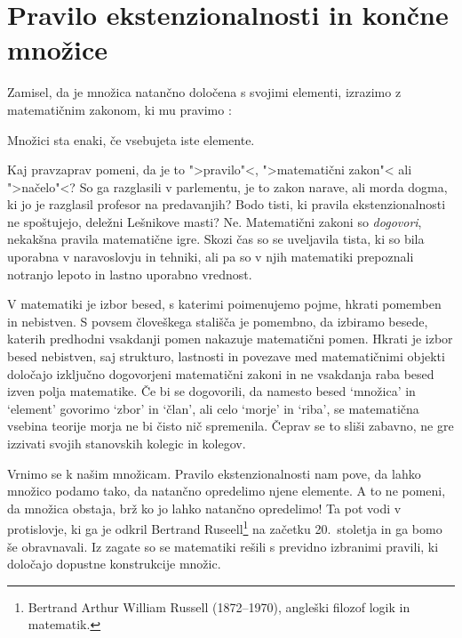 \section{Pravilo ekstenzionalnosti in končne množice}
\label{sec:koncne-mnozice}
\label{sec:nacelo-ekstenzionalnosti}

Zamisel, da je množica natančno določena s svojimi elementi, izrazimo z matematičnim
zakonom, ki mu pravimo :

\begin{pravilo}
  Množici sta enaki, če vsebujeta iste elemente.
\end{pravilo}

Kaj pravzaprav pomeni, da je to ">pravilo"<, ">matematični zakon"< ali ">načelo"<? So ga
razglasili v parlementu, je to zakon narave, ali morda dogma, ki jo je razglasil profesor
na predavanjih? Bodo tisti, ki pravila ekstenzionalnosti ne spoštujejo, deležni Lešnikove
masti? Ne. Matematični zakoni so \emph{dogovori}, nekakšna pravila matematične igre. Skozi
čas so se uveljavila tista, ki so bila uporabna v naravoslovju in tehniki, ali pa so v njih
matematiki prepoznali notranjo lepoto in lastno uporabno vrednost.

V matematiki je izbor besed, s katerimi poimenujemo pojme, hkrati pomemben in nebistven.
%
S povsem človeškega stališča je pomembno, da izbiramo besede, katerih predhodni vsakdanji pomen nakazuje matematični pomen.
%
Hkrati je izbor besed nebistven, saj strukturo, lastnosti in povezave med
matematičnimi objekti določajo izključno dogovorjeni matematični zakoni in ne vsakdanja raba besed izven polja matematike.
%
Če bi se dogovorili, da namesto besed  `množica' in `element' govorimo `zbor' in `član', ali celo `morje' in `riba', se matematična vsebina teorije morja ne bi čisto nič spremenila.
%
Čeprav se to sliši zabavno, ne gre izzivati svojih stanovskih kolegic in kolegov.

Vrnimo se k našim množicam. Pravilo ekstenzionalnosti nam pove, da lahko množico podamo
tako, da natančno opredelimo njene elemente. A to ne pomeni, da množica obstaja, brž ko jo
lahko natančno opredelimo! Ta  pot vodi v protislovje, ki ga je odkril Bertrand Ruseell\footnote{Bertrand Arthur William Russell (1872--1970), angleški filozof logik in matematik.} na začetku 20.~stoletja in ga bomo še obravnavali.
Iz zagate so se matematiki rešili s previdno izbranimi pravili, ki določajo dopustne konstrukcije množic.

